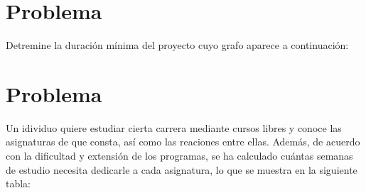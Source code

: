 \documentclass[autocontact]{gaceta}
\begin{document}
\section{Problema}
        Detremine la duración mínima del proyecto cuyo grafo aparece a continuación:
        
        \pagebreak


\section{Problema}
        Un idividuo quiere estudiar cierta carrera mediante cursos libres y conoce las asignaturas 
        de que consta, así como las reaciones entre ellas. Además, de acuerdo con la dificultad y 
        extensión de los programas, se ha calculado cuántas semanas de estudio necesita dedicarle 
        a cada asignatura, lo que se muestra en la siguiente tabla:
\end{document}
